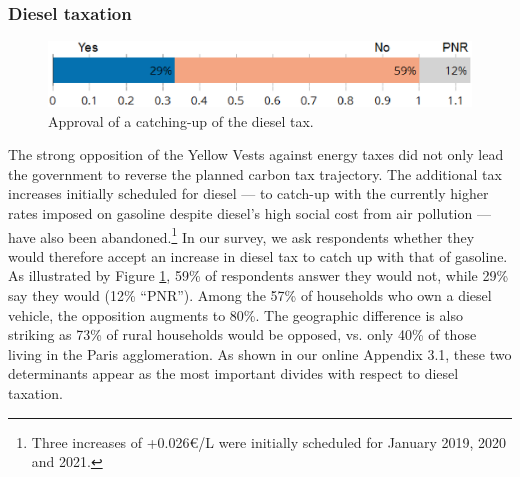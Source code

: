 \documentclass[english,5p,authoryear]{elsarticle}
\begin{document}
        \subsubsection{Diesel taxation}


\begin{figure}[b]
\centering
\includegraphics[width=0.9\columnwidth]{Images_EPS/diesel_catch_up_trim.eps}
\caption{Approval of a catching-up of the diesel tax.}
\label{fig:diesel}
\end{figure}

The strong opposition of the Yellow Vests against energy taxes did not only lead the government to reverse the planned carbon tax trajectory. The additional tax increases initially scheduled for diesel --- to catch-up with the currently higher rates imposed on gasoline despite diesel's high social cost from air pollution  --- have also been abandoned.\footnote{Three increases of +0.026\euro{}/L were initially scheduled for January 2019, 2020 and 2021.}  In our survey, we ask respondents whether they would therefore accept an increase in diesel tax to catch up with that of gasoline. As illustrated by Figure \ref{fig:diesel}, 59\% of respondents answer they would not, while 29\% say they would (12\% ``PNR''). Among the 57\% of households who own a diesel vehicle, the opposition augments to 80\%. The geographic difference is also striking as 73\% of rural households would be opposed, vs. only 40\% of those living in the Paris agglomeration. As shown in our online Appendix 3.1, these two determinants appear as the most important divides with respect to diesel taxation.

\end{document}
